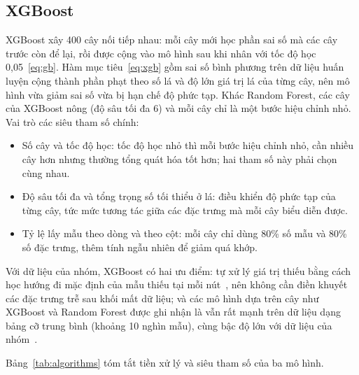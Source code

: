 \subsection{XGBoost}
XGBoost xây 400 cây nối tiếp nhau: mỗi cây mới học phần sai số mà các cây trước còn để lại, rồi được cộng vào mô hình sau khi nhân với tốc độ học 0,05~\eqref{eq:gb}. Hàm mục tiêu~\eqref{eq:xgb} gồm sai số bình phương trên dữ liệu huấn luyện cộng thành phần phạt theo số lá và độ lớn giá trị lá của từng cây, nên mô hình vừa giảm sai số vừa bị hạn chế độ phức tạp. Khác Random Forest, các cây của XGBoost nông (độ sâu tối đa 6) và mỗi cây chỉ là một bước hiệu chỉnh nhỏ. Vai trò các siêu tham số chính:
\begin{itemize}
    \item Số cây và tốc độ học: tốc độ học nhỏ thì mỗi bước hiệu chỉnh nhỏ, cần nhiều cây hơn nhưng thường tổng quát hóa tốt hơn; hai tham số này phải chọn cùng nhau.
    \item Độ sâu tối đa và tổng trọng số tối thiểu ở lá: điều khiển độ phức tạp của từng cây, tức mức tương tác giữa các đặc trưng mà mỗi cây biểu diễn được.
    \item Tỷ lệ lấy mẫu theo dòng và theo cột: mỗi cây chỉ dùng 80\% số mẫu và 80\% số đặc trưng, thêm tính ngẫu nhiên để giảm quá khớp.
\end{itemize}
Với dữ liệu của nhóm, XGBoost có hai ưu điểm: tự xử lý giá trị thiếu bằng cách học hướng đi mặc định của mẫu thiếu tại mỗi nút~\cite{chen2016xgboost}, nên không cần điền khuyết các đặc trưng trễ sau khối mất dữ liệu; và các mô hình dựa trên cây như XGBoost và Random Forest được ghi nhận là vẫn rất mạnh trên dữ liệu dạng bảng cỡ trung bình (khoảng 10 nghìn mẫu), cùng bậc độ lớn với dữ liệu của nhóm~\cite{grinsztajn2022why}.

Bảng~\ref{tab:algorithms} tóm tắt tiền xử lý và siêu tham số của ba mô hình.


